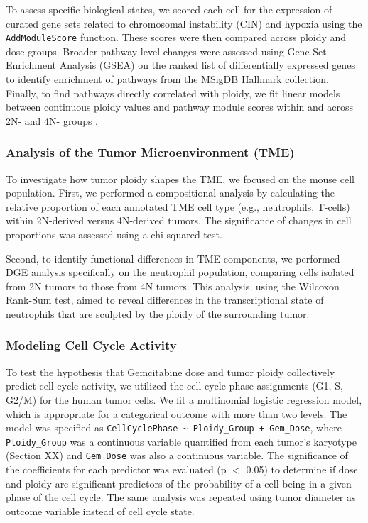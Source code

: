 \documentclass{article}
\begin{document}
To assess specific biological states, we scored each cell for the expression of curated gene sets related to chromosomal instability (CIN) and hypoxia using the \texttt{AddModuleScore} function. These scores were then compared across ploidy and dose groups. Broader pathway-level changes were assessed using Gene Set Enrichment Analysis (GSEA) on the ranked list of differentially expressed genes to identify enrichment of pathways from the MSigDB Hallmark collection. Finally, to find pathways directly correlated with ploidy, we fit linear models between continuous ploidy values and pathway module scores \color{blue} within and across 2N- and 4N- groups \color{black}.

\subsubsection{Analysis of the Tumor Microenvironment (TME)}
To investigate how tumor ploidy shapes the TME, we focused on the mouse cell population. First, we performed a compositional analysis by calculating the relative proportion of each annotated TME cell type (e.g., neutrophils, T-cells) within 2N-derived versus 4N-derived tumors. The significance of changes in cell proportions was assessed using a chi-squared test. 

Second, to identify functional differences in TME components, we performed DGE analysis specifically on the neutrophil population, comparing cells isolated from 2N tumors to those from 4N tumors. This analysis, using the Wilcoxon Rank-Sum test, aimed to reveal differences in the transcriptional state of neutrophils that are sculpted by the ploidy of the surrounding tumor.

\subsubsection{Modeling Cell Cycle Activity}
To test the hypothesis that Gemcitabine dose and tumor ploidy collectively predict cell cycle activity, we utilized the cell cycle phase assignments (G1, S, G2/M) for the human tumor cells. We fit a multinomial logistic regression model, which is appropriate for a categorical outcome with more than two levels. \color{blue} The model was specified as \texttt{CellCyclePhase \textasciitilde{} Ploidy\_Group + Gem\_Dose}, where \texttt{Ploidy\_Group} was a continuous variable quantified from each tumor's karyotype (Section XX) and \texttt{Gem\_Dose} was also a continuous variable. The significance of the coefficients for each predictor was evaluated (p $<$ 0.05) to determine if dose and ploidy are significant predictors of the probability of a cell being in a given phase of the cell cycle. The same analysis was repeated using tumor diameter as outcome variable instead of cell cycle state.\color{black}
\end{document}
